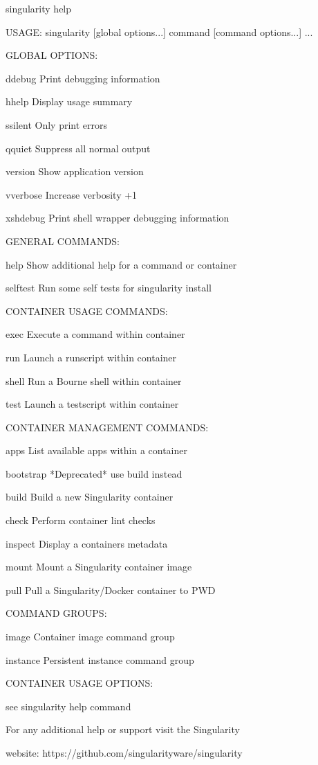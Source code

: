 \documentclass[letterpaper,10pt,english]{sphinxmanual}
\begin{document}
%
\begin{sphinxVerbatim}[commandchars=\\\{\}]
\PYGZdl{} singularity \PYGZhy{}\PYGZhy{}help

USAGE: singularity [global options...] \PYGZlt{}command\PYGZgt{} [command options...] ...


GLOBAL OPTIONS:

    \PYGZhy{}d\textbar{}\PYGZhy{}\PYGZhy{}debug    Print debugging information

    \PYGZhy{}h\textbar{}\PYGZhy{}\PYGZhy{}help     Display usage summary

    \PYGZhy{}s\textbar{}\PYGZhy{}\PYGZhy{}silent   Only print errors

    \PYGZhy{}q\textbar{}\PYGZhy{}\PYGZhy{}quiet    Suppress all normal output

       \PYGZhy{}\PYGZhy{}version  Show application version

    \PYGZhy{}v\textbar{}\PYGZhy{}\PYGZhy{}verbose  Increase verbosity +1

    \PYGZhy{}x\textbar{}\PYGZhy{}\PYGZhy{}sh\PYGZhy{}debug Print shell wrapper debugging information


GENERAL COMMANDS:

    help       Show additional help for a command or container

    selftest   Run some self tests for singularity install


CONTAINER USAGE COMMANDS:

    exec       Execute a command within container

    run        Launch a runscript within container

    shell      Run a Bourne shell within container

    test       Launch a testscript within container


CONTAINER MANAGEMENT COMMANDS:

    apps       List available apps within a container

    bootstrap  *Deprecated* use build instead

    build      Build a new Singularity container

    check      Perform container lint checks

    inspect    Display a container\PYGZsq{}s metadata

    mount      Mount a Singularity container image

    pull       Pull a Singularity/Docker container to \PYGZdl{}PWD


COMMAND GROUPS:

    image      Container image command group

    instance   Persistent instance command group


CONTAINER USAGE OPTIONS:

    see singularity help \PYGZlt{}command\PYGZgt{}

For any additional help or support visit the Singularity

website: https://github.com/singularityware/singularity
\end{sphinxVerbatim}
\end{document}
